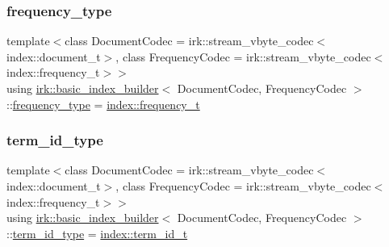 \mbox{\label{classirk_1_1basic__index__builder_a17364f665244bc4dc6b021f52442f794}} 
\subsubsection{\texorpdfstring{frequency\+\_\+type}{frequency\_type}}
{\footnotesize\ttfamily template$<$class Document\+Codec  = irk\+::stream\+\_\+vbyte\+\_\+codec$<$index\+::document\+\_\+t$>$, class Frequency\+Codec  = irk\+::stream\+\_\+vbyte\+\_\+codec$<$index\+::frequency\+\_\+t$>$$>$ \\
using \mbox{\hyperlink{classirk_1_1basic__index__builder}{irk\+::basic\+\_\+index\+\_\+builder}}$<$ Document\+Codec, Frequency\+Codec $>$\+::\mbox{\hyperlink{classirk_1_1basic__index__builder_a17364f665244bc4dc6b021f52442f794}{frequency\+\_\+type}} =  \mbox{\hyperlink{namespaceirk_1_1index_aa2cb48e79abd95deb25bbdf36c0ea70f}{index\+::frequency\+\_\+t}}}

\mbox{\label{classirk_1_1basic__index__builder_a468351209183fbd35691ab9b75f10d61}} 
\subsubsection{\texorpdfstring{term\+\_\+id\+\_\+type}{term\_id\_type}}
{\footnotesize\ttfamily template$<$class Document\+Codec  = irk\+::stream\+\_\+vbyte\+\_\+codec$<$index\+::document\+\_\+t$>$, class Frequency\+Codec  = irk\+::stream\+\_\+vbyte\+\_\+codec$<$index\+::frequency\+\_\+t$>$$>$ \\
using \mbox{\hyperlink{classirk_1_1basic__index__builder}{irk\+::basic\+\_\+index\+\_\+builder}}$<$ Document\+Codec, Frequency\+Codec $>$\+::\mbox{\hyperlink{classirk_1_1basic__index__builder_a468351209183fbd35691ab9b75f10d61}{term\+\_\+id\+\_\+type}} =  \mbox{\hyperlink{namespaceirk_1_1index_ae2ce3a02969196fe6dab4443ed2007d5}{index\+::term\+\_\+id\+\_\+t}}}

